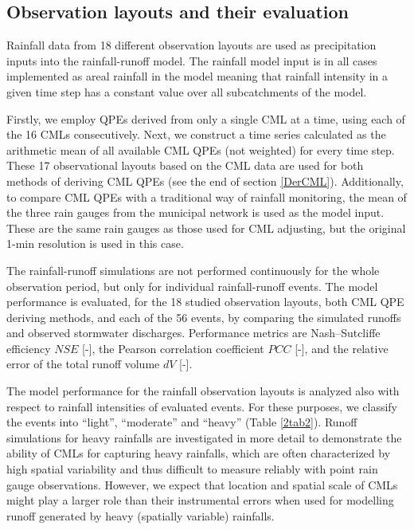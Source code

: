 \documentclass{ctuthesis}\usepackage[]{graphicx}\usepackage[]{color}
\begin{document}
\subsection{Observation layouts and their evaluation} \label{ObsLay}

Rainfall data from 18 different observation layouts are used as precipitation inputs into the rainfall-runoff model. The rainfall model input is in all cases implemented as areal rainfall in the model meaning that rainfall intensity in a given time step has a constant value over all subcatchments of the model. 

Firstly, we employ QPEs derived from only a single CML at a time, using each of the 16 CMLs consecutively. Next, we construct a time series calculated as the arithmetic mean of all available CML QPEs (not weighted) for every time step. These 17 observational layouts based on the CML data are used for both methods of deriving CML QPEs (see the end of section \ref{DerCML}). Additionally, to compare CML QPEs with a traditional way of rainfall monitoring, the mean of the three rain gauges from the municipal network is used as the model input. These are the same rain gauges as those used for CML adjusting, but the original 1-min resolution is used in this case. 

The rainfall-runoff simulations are not performed continuously for the whole observation period, but only for individual rainfall-runoff events. The model performance is evaluated, for the 18 studied observation layouts, both CML QPE deriving methods, and each of the 56 events, by comparing the simulated runoffs and observed stormwater discharges. Performance metrics are Nash–Sutcliffe efficiency $NSE$ [-], the Pearson correlation coefficient $PCC$ [-], and the relative error of the total runoff volume $dV$ [-].

The model performance for the rainfall observation layouts is analyzed also with respect to rainfall intensities of evaluated events. For these purposes, we classify the events into “light”, “moderate” and “heavy” (Table \ref{2tab2}). Runoff simulations for heavy rainfalls are investigated in more detail to demonstrate the ability of CMLs for capturing heavy rainfalls, which are often characterized by high spatial variability and thus difficult to measure reliably with point rain gauge observations. However, we expect that location and spatial scale of CMLs might play a larger role than their instrumental errors when used for modelling runoff generated by heavy (spatially variable) rainfalls.
\end{document}
